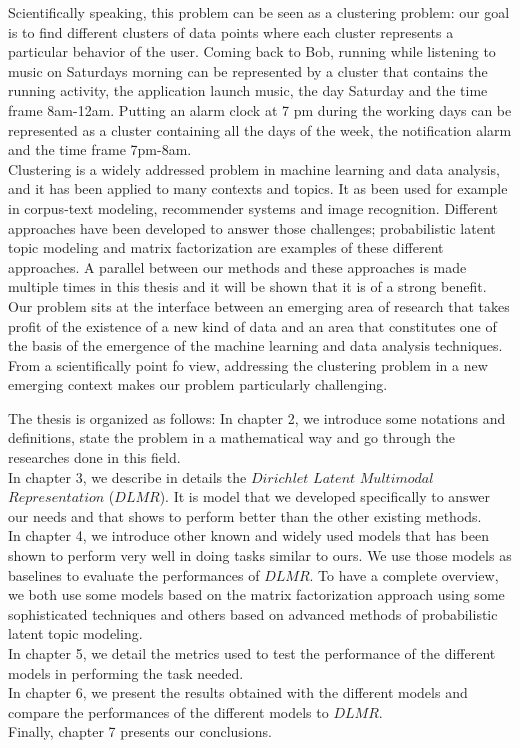 Scientifically speaking, this problem can be seen as a clustering problem: our goal is to find different clusters of data points where each cluster represents a particular behavior of the user. Coming back to Bob, running while listening to music on Saturdays morning can be represented by a cluster that contains the running activity, the application launch music, the day Saturday and the time frame 8am-12am. Putting an alarm clock at 7 pm during the working days can be represented as a cluster containing all the days of the week, the notification alarm and the time frame 7pm-8am. 
\\Clustering is a widely addressed problem in machine learning and data analysis, and it has been applied to many contexts and topics. It as been used for example in corpus-text modeling, recommender systems and image recognition. Different approaches have been developed to answer those challenges; probabilistic latent topic modeling and matrix factorization are examples of these different approaches. A parallel between our methods and these approaches is made multiple times in this thesis and it will be shown that it is of a strong benefit. 
\\Our problem sits at the interface between an emerging area of research that takes profit of the existence of a new kind of data and an area that constitutes one of the basis of the emergence of the machine learning and data analysis techniques. From a scientifically point fo view, addressing the clustering problem in a new emerging context makes our problem particularly challenging. \par

The thesis is organized as follows: In chapter 2, we introduce some notations and definitions, state the problem in a mathematical way and go through the researches done in this field. 
\\In chapter 3, we describe in details the $Dirichlet$ $Latent$ $Multimodal$ $Representation$ ($DLMR$). It is model that we developed specifically to answer our needs and that shows to perform better than the other existing methods.
\\In chapter 4, we introduce other known and widely used models that has been shown to perform very well in doing tasks similar to ours. We use those models as baselines to evaluate the performances of $DLMR$. To have a complete overview, we both use some models based on the matrix factorization approach using some sophisticated techniques and others based on advanced methods of probabilistic latent topic modeling.
\\In chapter 5, we detail the metrics used to test the performance of the different models in performing the task needed.
\\In chapter 6, we present the results obtained with the different models and compare the performances of the different models to $DLMR$.
\\Finally, chapter 7 presents our conclusions.


